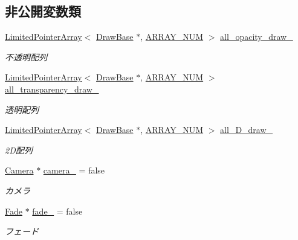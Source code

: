 \subsection*{非公開変数類}
\begin{DoxyCompactItemize}
\item 
\mbox{\hyperlink{class_limited_pointer_array}{Limited\+Pointer\+Array}}$<$ \mbox{\hyperlink{class_draw_base}{Draw\+Base}} $\ast$, \mbox{\hyperlink{class_back_buffer_a28e89a0c543b6ae579c8ab75f9917059}{A\+R\+R\+A\+Y\+\_\+\+N\+UM}} $>$ \mbox{\hyperlink{class_back_buffer_a65bf72418a1ca652ef535a172bc3d7b8}{all\+\_\+opacity\+\_\+draw\+\_\+}}
\begin{DoxyCompactList}\small\item\em 不透明配列 \end{DoxyCompactList}\item 
\mbox{\hyperlink{class_limited_pointer_array}{Limited\+Pointer\+Array}}$<$ \mbox{\hyperlink{class_draw_base}{Draw\+Base}} $\ast$, \mbox{\hyperlink{class_back_buffer_a28e89a0c543b6ae579c8ab75f9917059}{A\+R\+R\+A\+Y\+\_\+\+N\+UM}} $>$ \mbox{\hyperlink{class_back_buffer_a4148d27e959958813e88cc71ebec1a6e}{all\+\_\+transparency\+\_\+draw\+\_\+}}
\begin{DoxyCompactList}\small\item\em 透明配列 \end{DoxyCompactList}\item 
\mbox{\hyperlink{class_limited_pointer_array}{Limited\+Pointer\+Array}}$<$ \mbox{\hyperlink{class_draw_base}{Draw\+Base}} $\ast$, \mbox{\hyperlink{class_back_buffer_a28e89a0c543b6ae579c8ab75f9917059}{A\+R\+R\+A\+Y\+\_\+\+N\+UM}} $>$ \mbox{\hyperlink{class_back_buffer_a00e14584e9716e4fbfb30053d3cbdee2}{all\+\_\+D\+\_\+draw\+\_\+}}
\begin{DoxyCompactList}\small\item\em 2\+D配列 \end{DoxyCompactList}\item 
\mbox{\hyperlink{class_camera}{Camera}} $\ast$ \mbox{\hyperlink{class_back_buffer_ad74b6bc6dca299c3f411734de08f2642}{camera\+\_\+}} = false
\begin{DoxyCompactList}\small\item\em カメラ \end{DoxyCompactList}\item 
\mbox{\hyperlink{class_fade}{Fade}} $\ast$ \mbox{\hyperlink{class_back_buffer_a65150f62ddfb58d923b6831ebaf63c30}{fade\+\_\+}} = false
\begin{DoxyCompactList}\small\item\em フェード \end{DoxyCompactList}\item 

\end{DoxyCompactItemize}
